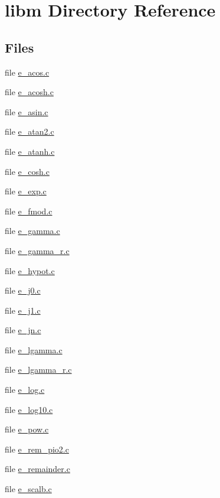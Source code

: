 \hypertarget{dir_000006}{}\section{libm Directory Reference}
\label{dir_000006}
\subsection*{Files}
\begin{DoxyCompactItemize}
\item 
file \hyperlink{e__acos_8c}{e\+\_\+acos.\+c}
\item 
file \hyperlink{e__acosh_8c}{e\+\_\+acosh.\+c}
\item 
file \hyperlink{e__asin_8c}{e\+\_\+asin.\+c}
\item 
file \hyperlink{e__atan2_8c}{e\+\_\+atan2.\+c}
\item 
file \hyperlink{e__atanh_8c}{e\+\_\+atanh.\+c}
\item 
file \hyperlink{e__cosh_8c}{e\+\_\+cosh.\+c}
\item 
file \hyperlink{e__exp_8c}{e\+\_\+exp.\+c}
\item 
file \hyperlink{e__fmod_8c}{e\+\_\+fmod.\+c}
\item 
file \hyperlink{e__gamma_8c}{e\+\_\+gamma.\+c}
\item 
file \hyperlink{e__gamma__r_8c}{e\+\_\+gamma\+\_\+r.\+c}
\item 
file \hyperlink{e__hypot_8c}{e\+\_\+hypot.\+c}
\item 
file \hyperlink{e__j0_8c}{e\+\_\+j0.\+c}
\item 
file \hyperlink{e__j1_8c}{e\+\_\+j1.\+c}
\item 
file \hyperlink{e__jn_8c}{e\+\_\+jn.\+c}
\item 
file \hyperlink{e__lgamma_8c}{e\+\_\+lgamma.\+c}
\item 
file \hyperlink{e__lgamma__r_8c}{e\+\_\+lgamma\+\_\+r.\+c}
\item 
file \hyperlink{e__log_8c}{e\+\_\+log.\+c}
\item 
file \hyperlink{e__log10_8c}{e\+\_\+log10.\+c}
\item 
file \hyperlink{e__pow_8c}{e\+\_\+pow.\+c}
\item 
file \hyperlink{e__rem__pio2_8c}{e\+\_\+rem\+\_\+pio2.\+c}
\item 
file \hyperlink{e__remainder_8c}{e\+\_\+remainder.\+c}
\item 
file \hyperlink{e__scalb_8c}{e\+\_\+scalb.\+c}

\end{DoxyCompactItemize}
